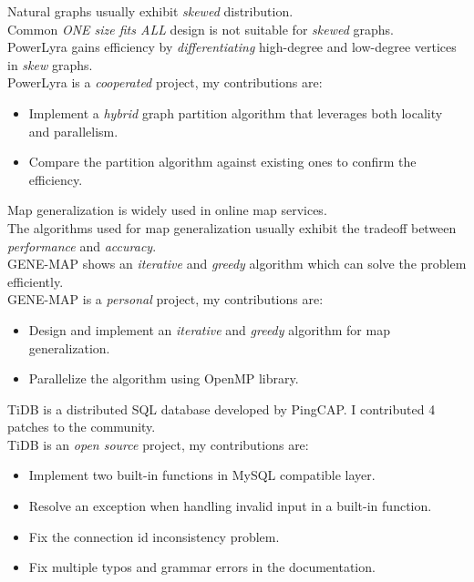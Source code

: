 \documentclass{resume}
\begin{document}
Natural graphs usually exhibit \textit{skewed} distribution.
\\[2pt]
Common \textit{ONE size fits ALL} design is not suitable for \textit{skewed} graphs.
\\[2pt]
PowerLyra gains efficiency by \textit{differentiating} high-degree and low-degree vertices in \textit{skew} graphs.
\\[2pt]
PowerLyra is a \textit{cooperated} project, my contributions are:
\begin{itemize}
  \item {Implement a \textit{hybrid} graph partition algorithm that leverages both locality and parallelism.}
  \item {Compare the partition algorithm against existing ones to confirm the efficiency.}
\end{itemize}

Map generalization is widely used in online map services.
\\[2pt]
The algorithms used for map generalization usually exhibit the tradeoff between \textit{performance} and \textit{accuracy}.
\\[2pt]
GENE-MAP shows an \textit{iterative} and \textit{greedy} algorithm which can solve the problem efficiently.
\\[2pt]
GENE-MAP is a \textit{personal} project, my contributions are:
\begin{itemize}
  \item {Design and implement an \textit{iterative} and \textit{greedy} algorithm for map generalization.}
  \item {Parallelize the algorithm using OpenMP library.}
\end{itemize}

TiDB is a distributed SQL database developed by PingCAP. I contributed 4 patches to the community.
\\[2pt]
TiDB is an \textit{open source} project, my contributions are:
\begin{itemize}
  \item {Implement two built-in functions in MySQL compatible layer.}
  \item {Resolve an exception when handling invalid input in a built-in function.}
  \item {Fix the connection id inconsistency problem.}
  \item {Fix multiple typos and grammar errors in the documentation.}
\end{itemize}
\end{document}
